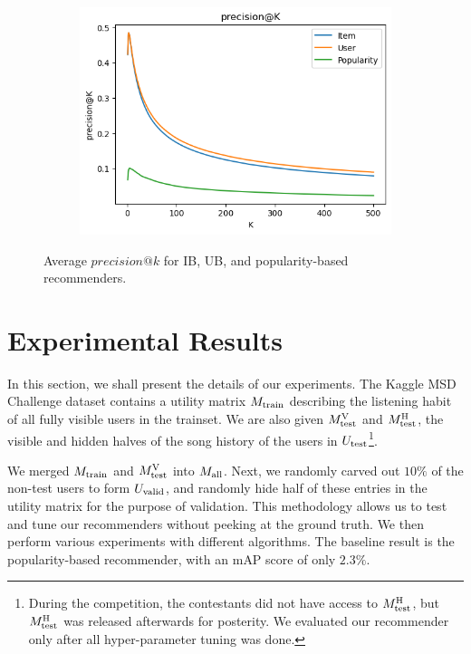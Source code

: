\documentclass[conference]{IEEEtran}
\newcommand{\mAP}{m\textsc{AP} }
\begin{document}
\begin{figure}[htbp]
\centering
\begin{subfigure}{0.85\columnwidth}
  \centering
  \includegraphics[width=\columnwidth]{precision-at-k.png}
\end{subfigure}
\caption{Average $precision\textrm{@}k$ for IB, UB, and popularity-based recommenders.}
\label{fig:precision-at-k}
\end{figure}

\section{Experimental Results}

In this section, we shall present the details of our experiments. The Kaggle
MSD Challenge dataset
contains a utility matrix $M_{\rm train}$ describing the
listening habit of all fully visible users in the trainset.
We are also given
$M^{\rm V}_{\rm test}$ and $M^{\rm H}_{\rm test}$, the
visible and hidden halves of the song history of the users in
$U_{\rm test}$\footnote{During the competition,
the contestants did not have access to $M^{\rm H}_{\rm test}$, but $M^{\rm H}_{\rm test}$ was
released afterwards for posterity. We evaluated our recommender only
after all hyper-parameter tuning was done.}.

We merged $M_{\rm train}$ and
$M^{\rm V}_{\rm test}$ into $M_{\rm all}$. Next, we randomly carved out $10\%$ of
the non-test users to form $U_{\rm valid}$,
and randomly hide half of these entries in the
utility matrix for the purpose of validation.
This methodology allows us to test and tune
our recommenders without peeking at the ground truth.
We then perform various experiments with different algorithms. The baseline
result is the popularity-based recommender, with an \mAP score
of only $2.3\%$.
\end{document}
